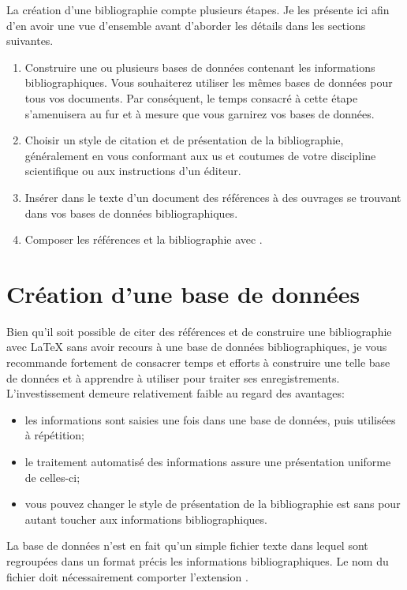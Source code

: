 La création d'une bibliographie compte plusieurs étapes. Je les
présente ici afin d'en avoir une vue d'ensemble avant d'aborder les
détails dans les sections suivantes.

\begin{enumerate}
\item Construire une ou plusieurs bases de données contenant les
  informations bibliographiques. Vous souhaiterez utiliser les mêmes
  bases de données pour tous vos documents. Par conséquent, le temps
  consacré à cette étape s'amenuisera au fur et à mesure que vous
  garnirez vos bases de données.
\item Choisir un style de citation et de présentation de la
  bibliographie, généralement en vous conformant aux us et coutumes de
  votre discipline scientifique ou aux instructions d'un éditeur.
\item Insérer dans le texte d'un document des références à des
  ouvrages se trouvant dans vos bases de données bibliographiques.
\item Composer les références et la bibliographie avec {\BibTeX}.
\end{enumerate}


\section{Création d'une base de données}
\label{sec:bibliographie:bib}

Bien qu'il soit possible de citer des références et de construire une
bibliographie avec {\LaTeX} sans avoir recours à une base de données
bibliographiques, je vous recommande fortement de consacrer temps et
efforts à construire une telle base de données et à apprendre à
utiliser {\BibTeX} pour traiter ses enregistrements. L'investissement
demeure relativement faible au regard des avantages:
\begin{itemize}
\item les informations sont saisies une fois dans une base de données,
  puis utilisées à répétition;
\item le traitement automatisé des informations assure une
  présentation uniforme de celles-ci;
\item vous pouvez changer le style de présentation de la bibliographie
  est sans pour autant toucher aux informations bibliographiques.
\end{itemize}

La base de données n'est en fait qu'un simple fichier texte dans
lequel sont regroupées dans un format précis les informations
bibliographiques. Le nom du fichier doit nécessairement comporter
l'extension .

